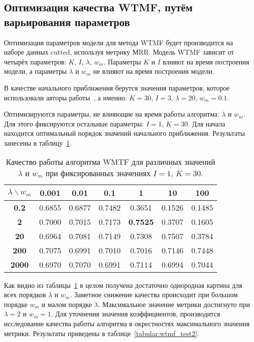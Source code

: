 \subsection{Оптимизация качества WTMF, путём варьирования параметров}
    Оптимизация параметров модели для метода WTMF будет производится на наборе данных cutted, используя метрику МRR.
    Модель WTMF зависит от четырёх параметров: $K$, $I$, $\lambda$, $w_m$.
    Параметры $K$ и $I$ влияют на время построения модели, а параметры $\lambda$ и $w_m$ не влияют на время построения модели.

    В качестве начального приближения берутся значения параметров, которое использовали авторы работы~\cite{linking_base}, а именно:
    $K=30$, $I=3$, $\lambda=20$, $w_m=0.1$.

    Оптимизируются параметры, не влияющие на время работы алгоритма: $\lambda$ и $w_m$.
    Для этого фиксируются остальные параметры: $I=1$, $K=30$.
    Для начала находится оптимальный порядок значений начального приближения. Результаты занесены в таблицу~\ref{tabular:wtmf_test1}.

    \begin{table}[ht!]
        \caption{Качество работы алгоритма WMTF для различных значений $\lambda$ и $w_m$ при фиксированных значениях $I=1$, $K=30$. \bigskip}
        \centering

        \label{tabular:wtmf_test1}
        \begin{tabular}{|c|c|c|c|c|c|c|} \hline
            $\lambda \backslash w_m$ & \bf{0.001} & \bf{0.01} & \bf{0.1} & \bf{1} & \bf{10} & \bf{100} \\ \hline
            \bf{0.2} & 0.6855 & 0.6877 & 0.7482 & 0.3651 & 0.1526 & 0.1485 \\ \hline
            \bf{2} & 0.7000 & 0.7015 & 0.7173 & \bf{0.7525} & 0.3707 & 0.1605 \\ \hline
            \bf{20} & 0.6964 & 0.7081 & 0.7149 & 0.7308 & 0.7507 & 0.3784 \\ \hline
            \bf{200} & 0.7075 & 0.6991 & 0.7010 & 0.7016 & 0.7146 & 0.7448 \\ \hline
            \bf{2000} & 0.6970 & 0.7070 & 0.6991 & 0.7114 & 0.6994 & 0.7044 \\ \hline
        \end{tabular}
    \end{table}
    Как видно из таблицы~\ref{tabular:wtmf_test1} в целом получена достаточно однородная картина для всех порядков $\lambda$ и $w_m$.
    Заметное снижение качества происходит при большом порядке $w_m$ и малом порядке $\lambda$.
    Максимальное значение метрики достигнуто при $\lambda=2$ и $w_m=1$.
    Для уточнения значения коэффициентов, производится исследование качества работы алгоритма в окрестностях максимального значения метрики.
    Результаты приведены в таблице~\ref{tabular:wtmf_test2}.

